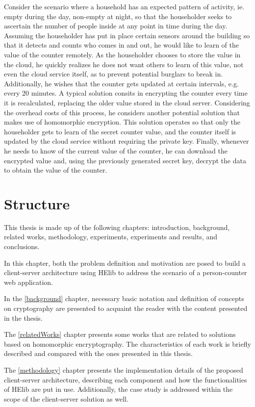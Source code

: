 Consider the scenario where a household has an expected pattern of activity, ie. empty during the day, non-empty at night, so that the householder seeks to ascertain the number of people inside at any point in time during the day. Assuming the householder has put in place certain sensors around the building so that it detects and counts who comes in and out, he would like to learn of the value of the counter remotely. As the householder chooses to store the value in the cloud, he quickly realizes he does not want others to learn of this value, not even the cloud service itself, as to prevent potential burglars to break in. Additionally, he wishes that the counter gets updated at certain intervals, e.g. every 20 minutes. A typical solution consits in encrypting the counter every time it is recalculated, replacing the older value stored in the cloud server. Considering the overhead costs of this process, he considers another potential solution that makes use of homomorphic encryption. This solution operates so that only the householder gets to learn of the secret counter value, and the counter itself is updated by the cloud service without requiring the private key. Finally, whenever he needs to know of the current value of the counter, he can download the encrypted value and, using the previously generated secret key, decrypt the data to obtain the value of the counter.

\section{Structure}
This thesis is made up of the following chapters: introduction, background, related works, methodology, experiments, experiments and results, and conclusions.

In this chapter, both the problem definition and motivation are posed to build a client-server architecture using HElib to address the scenario of a person-counter web application.

In the  \ref{background} chapter, necessary basic notation and definition of concepts on cryptography are presented to acquaint the reader with the content presented in the thesis.

The \ref{relatedWorks} chapter presents some works that are related to solutions based on homomorphic encryptography. The characteristics of each work is briefly described and compared with the ones presented in this thesis.

The \ref{methodology} chapter presents the implementation details of the proposed client-server architecture, describing each component and how the functionalities of HElib are put in use. Additionally, the case study is addressed within the scope of the client-server solution as well.

